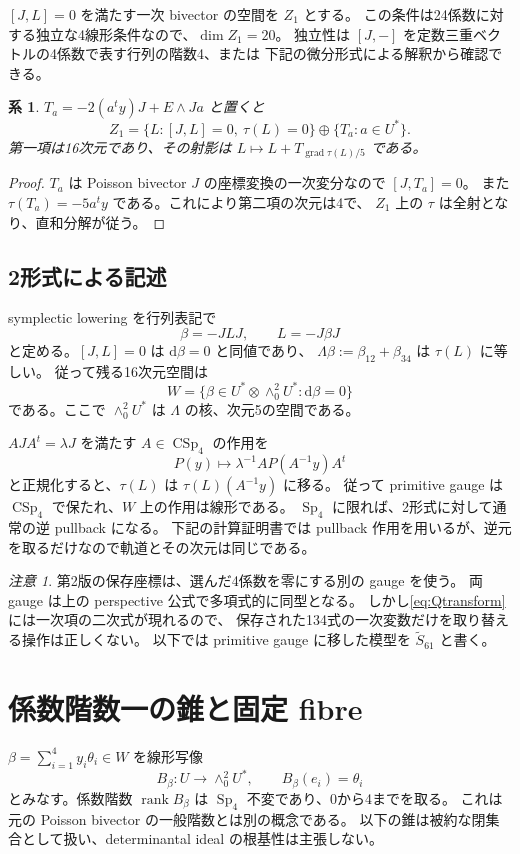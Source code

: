 \documentclass[11pt,a4paper]{ltjsarticle}
\newcommand{\dd}{\mathrm d}
\DeclareMathOperator{\Sp}{Sp}
\DeclareMathOperator{\CSp}{CSp}
\DeclareMathOperator{\rank}{rank}
\DeclareMathOperator{\grad}{grad}
\newtheorem{corollary}[theorem]{系}
\theoremstyle{remark}
\newtheorem{remark}[theorem]{注意}
\begin{document}
$[J,L]=0$ を満たす一次 bivector の空間を $Z_1$ とする。
この条件は24係数に対する独立な4線形条件なので、$\dim Z_1=20$。
独立性は $[J,-]$ を定数三重ベクトルの4係数で表す行列の階数4、または
下記の微分形式による解釈から確認できる。

\begin{corollary}\label{cor:split}
$T_a=-2(a^t y)J+E\wedge Ja$ と置くと
\[
 Z_1=\{L:[J,L]=0,\ \tau(L)=0\}\oplus\{T_a:a\in U^*\}.
\]
第一項は16次元であり、その射影は
$L\mapsto L+T_{\grad\tau(L)/5}$ である。
\end{corollary}
\begin{proof}
$T_a$ は Poisson bivector $J$ の座標変換の一次変分なので $[J,T_a]=0$。
また $\tau(T_a)=-5a^t y$ である。これにより第二項の次元は4で、
$Z_1$ 上の $\tau$ は全射となり、直和分解が従う。
\end{proof}

\subsection{2形式による記述}
symplectic lowering を行列表記で
\[
 \beta=-JLJ,\qquad L=-J\beta J
\]
と定める。$[J,L]=0$ は $\dd\beta=0$ と同値であり、
$\Lambda\beta:=\beta_{12}+\beta_{34}$ は $\tau(L)$ に等しい。
従って残る16次元空間は
\begin{equation}\label{eq:W}
 W=\{\beta\in U^*\otimes\wedge^2_0U^*: \dd\beta=0\}
\end{equation}
である。ここで $\wedge^2_0U^*$ は $\Lambda$ の核、次元5の空間である。

$AJA^t=\lambda J$ を満たす $A\in\CSp_4$ の作用を
\[
 P(y)\longmapsto\lambda^{-1}AP(A^{-1}y)A^t
\]
と正規化すると、$\tau(L)$ は $\tau(L)(A^{-1}y)$ に移る。
従って primitive gauge は $\CSp_4$ で保たれ、$W$ 上の作用は線形である。
$\Sp_4$ に限れば、2形式に対して通常の逆 pullback になる。
下記の計算証明書では pullback 作用を用いるが、逆元を取るだけなので軌道とその次元は同じである。

\begin{remark}
第2版の保存座標は、選んだ4係数を零にする別の gauge を使う。
両 gauge は上の perspective 公式で多項式的に同型となる。
しかし\eqref{eq:Qtransform}には一次項の二次式が現れるので、
保存された134式の一次変数だけを取り替える操作は正しくない。
以下では primitive gauge に移した模型を $\widetilde S_{61}$ と書く。
\end{remark}

\section{係数階数一の錐と固定 fibre}
$\beta=\sum_{i=1}^4y_i\theta_i\in W$ を線形写像
\[
 B_\beta:U\longrightarrow\wedge^2_0U^*,\qquad B_\beta(e_i)=\theta_i
\]
とみなす。係数階数 $\rank B_\beta$ は $\Sp_4$ 不変であり、0から4までを取る。
これは元の Poisson bivector の一般階数とは別の概念である。
以下の錐は被約な閉集合として扱い、determinantal ideal の根基性は主張しない。
\end{document}
